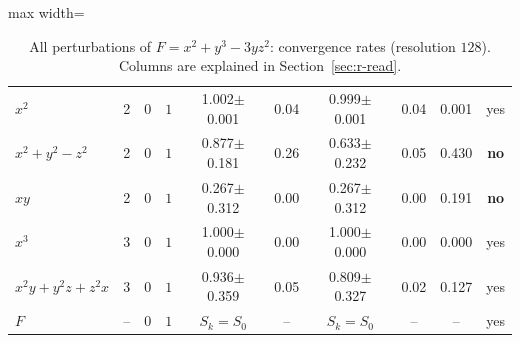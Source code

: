 \documentclass[12pt, a4paper, oneside]{book}
\theoremstyle{plain}
\theoremstyle{definition}
\theoremstyle{remark}
\theoremstyle{definition}
\begin{document}
\begin{table}[!h]
\begin{adjustbox}{max width=\textwidth}
\begin{tabular}{l c l c c c c c c c}
$x^2$ & 2 & $0$ & $1$ & 1.002{\scriptsize$\pm$0.001} & 0.04 & 0.999{\scriptsize$\pm$0.001} & 0.04 & 0.001 & yes \\
$x^2+y^2-z^2$ & 2 & $0$ & $1$ & 0.877{\scriptsize$\pm$0.181} & 0.26 & 0.633{\scriptsize$\pm$0.232} & 0.05 & 0.430 & \textbf{no} \\
$xy$ & 2 & $0$ & $1$ & 0.267{\scriptsize$\pm$0.312} & 0.00 & 0.267{\scriptsize$\pm$0.312} & 0.00 & 0.191 & \textbf{no} \\
$x^3$ & 3 & $0$ & $1$ & 1.000{\scriptsize$\pm$0.000} & 0.00 & 1.000{\scriptsize$\pm$0.000} & 0.00 & 0.000 & yes \\
$x^2y+y^2z+z^2x$ & 3 & $0$ & $1$ & 0.936{\scriptsize$\pm$0.359} & 0.05 & 0.809{\scriptsize$\pm$0.327} & 0.02 & 0.127 & yes \\
$F$ & -- & $0$ & $1$ & $S_k=S_0$ & -- & $S_k=S_0$ & -- & -- & yes \\
\bottomrule
\end{tabular}
\end{adjustbox}
\caption[Rates for $x^2+y^3-3yz^2$]{All perturbations of $F=x^2+y^3-3yz^2$: convergence rates (resolution $128$). Columns are explained in Section~\ref{sec:r-read}.}
\label{tab:r-D4b-rates}
\end{table}
\end{document}
